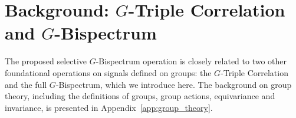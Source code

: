 \documentclass{article}
\theoremstyle{plain}
\theoremstyle{definition}
\theoremstyle{remark}
\newcommand{\simcom}[1]{\textcolor{blue}{[SM: #1]}}
\begin{document}






\section{Background: $G$-Triple Correlation and $G$-Bispectrum}\label{sec:triple_corr_and_bsp}

The proposed selective $G$-Bispectrum operation is closely related to two other foundational operations on signals defined on groups: the $G$-Triple Correlation and the full $G$-Bispectrum, which we introduce here. The background on group theory, including the definitions of groups, group actions, equivariance and invariance, is presented in Appendix~\ref{app:group_theory}.
\end{document}
